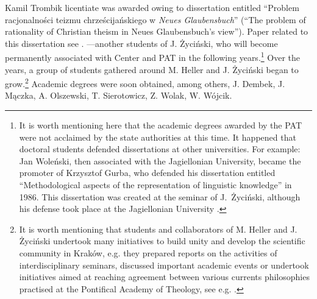 \begin{artengenv}{Kamil Trombik}
{licentiate was awarded owing to dissertation entitled ``Problem racjonalności teizmu chrześcijańskiego w \textit{Neues
Glaubensbuch}'' (``The problem of rationality of Christian theism in Neues Glaubensbuch's view''). Paper related to this
dissertation see
\parencite{dadaczynski_poznanie_1984}.
}---another students of J. Życiński, who will become
permanently associated with Center and PAT in the following years.\footnote{It is worth mentioning here that the
academic degrees awarded by the PAT were not acclaimed by the state authorities at this time. It happened that doctoral
students defended dissertations at other universities. For example: Jan Woleński, then associated with the Jagiellonian
University, became the promoter of Krzysztof Gurba, who defended his dissertation entitled ``Methodological aspects of
the representation of linguistic knowledge'' in 1986. This dissertation was created at the seminar of J.~Życiński,
although his defense took place at the Jagiellonian University
\parencite{wolenski_interview_2017}.
} Over the
years, a group of students gathered around M. Heller and J. Życiński began to grow.\footnote{It is worth mentioning
that students and collaborators of M. Heller and J. Życiński undertook many initiatives to build unity and develop the
scientific community in Kraków, e.g. they prepared reports on the activities of interdisciplinary seminars, discussed
important academic events or undertook initiatives aimed at reaching agreement between various currents philosophies
practised at the Pontifical Academy of Theology, see e.g.
\parencite{michalik_wstep_1984,glodz_miedzynarodowe_1987,samborski_intuicjonizm_1987,liana_w_1989,%
	dembek_matematycznosc_1990,wolak_interdyscyplinarnosc_1992,samborski_na_1992,wolak_neotomizm_1993}.
} Academic
degrees were soon obtained, among others, J. Dembek, J. Mączka, A. Olszewski, T. Sierotowicz, Z. Wolak, W. Wójcik.


\end{artengenv}
